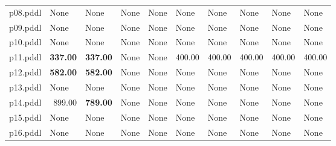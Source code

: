 \documentclass{article}
\begin{document}
\begin{tabular}{@{}lrrrrrrrrr@{}}
p08.pddl & \multicolumn{1}{|l|}{None} & \multicolumn{1}{|l|}{None} & \multicolumn{1}{|l|}{None} & \multicolumn{1}{|l|}{None} & \multicolumn{1}{|l|}{None} & \multicolumn{1}{|l|}{None} & \multicolumn{1}{|l|}{None} & \multicolumn{1}{|l|}{None} & \multicolumn{1}{|l|}{None} \\
p09.pddl & \multicolumn{1}{|l|}{None} & \multicolumn{1}{|l|}{None} & \multicolumn{1}{|l|}{None} & \multicolumn{1}{|l|}{None} & \multicolumn{1}{|l|}{None} & \multicolumn{1}{|l|}{None} & \multicolumn{1}{|l|}{None} & \multicolumn{1}{|l|}{None} & \multicolumn{1}{|l|}{None} \\
p10.pddl & \multicolumn{1}{|l|}{None} & \multicolumn{1}{|l|}{None} & \multicolumn{1}{|l|}{None} & \multicolumn{1}{|l|}{None} & \multicolumn{1}{|l|}{None} & \multicolumn{1}{|l|}{None} & \multicolumn{1}{|l|}{None} & \multicolumn{1}{|l|}{None} & \multicolumn{1}{|l|}{None} \\
p11.pddl & \textbf{337.00} & \textbf{337.00} & \multicolumn{1}{|l|}{None} & \multicolumn{1}{|l|}{None} & 400.00 & 400.00 & 400.00 & 400.00 & 400.00 \\
p12.pddl & \textbf{582.00} & \textbf{582.00} & \multicolumn{1}{|l|}{None} & \multicolumn{1}{|l|}{None} & \multicolumn{1}{|l|}{None} & \multicolumn{1}{|l|}{None} & \multicolumn{1}{|l|}{None} & \multicolumn{1}{|l|}{None} & \multicolumn{1}{|l|}{None} \\
p13.pddl & \multicolumn{1}{|l|}{None} & \multicolumn{1}{|l|}{None} & \multicolumn{1}{|l|}{None} & \multicolumn{1}{|l|}{None} & \multicolumn{1}{|l|}{None} & \multicolumn{1}{|l|}{None} & \multicolumn{1}{|l|}{None} & \multicolumn{1}{|l|}{None} & \multicolumn{1}{|l|}{None} \\
p14.pddl & 899.00 & \textbf{789.00} & \multicolumn{1}{|l|}{None} & \multicolumn{1}{|l|}{None} & \multicolumn{1}{|l|}{None} & \multicolumn{1}{|l|}{None} & \multicolumn{1}{|l|}{None} & \multicolumn{1}{|l|}{None} & \multicolumn{1}{|l|}{None} \\
p15.pddl & \multicolumn{1}{|l|}{None} & \multicolumn{1}{|l|}{None} & \multicolumn{1}{|l|}{None} & \multicolumn{1}{|l|}{None} & \multicolumn{1}{|l|}{None} & \multicolumn{1}{|l|}{None} & \multicolumn{1}{|l|}{None} & \multicolumn{1}{|l|}{None} & \multicolumn{1}{|l|}{None} \\
p16.pddl & \multicolumn{1}{|l|}{None} & \multicolumn{1}{|l|}{None} & \multicolumn{1}{|l|}{None} & \multicolumn{1}{|l|}{None} & \multicolumn{1}{|l|}{None} & \multicolumn{1}{|l|}{None} & \multicolumn{1}{|l|}{None} & \multicolumn{1}{|l|}{None} & \multicolumn{1}{|l|}{None} \\

\end{tabular}
\end{document}

